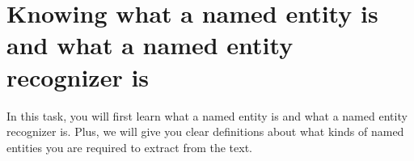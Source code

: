 
\chapter{Knowing what a named entity is and what a named entity recognizer is}

In this task, you will first learn what a named entity is and what a named entity
recognizer is. Plus, we will give you clear definitions about what kinds of named
entities you are required to extract from the text.






